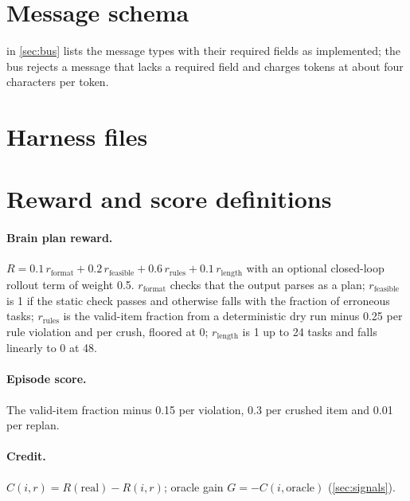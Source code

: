 \section{Message schema}\label{app:messages}
 in \cref{sec:bus} lists the \nMsgTypes{} message types with their required fields as implemented; the bus rejects a message that lacks a required field and charges tokens at about four characters per token.

\section{Harness files}\label{app:harness}
\begin{table}[h]
\centering\scriptsize

\caption{The \nHarnessFiles{} harness files with their retrieval keywords.}
\end{table}

\section{Reward and score definitions}\label{app:rewards}
\paragraph{Brain plan reward.} $R = 0.1\,r_{\text{format}} + 0.2\,r_{\text{feasible}} + 0.6\,r_{\text{rules}} + 0.1\,r_{\text{length}}$ with an optional closed-loop rollout term of weight 0.5.
$r_{\text{format}}$ checks that the output parses as a plan; $r_{\text{feasible}}$ is 1 if the static check passes and otherwise falls with the fraction of erroneous tasks; $r_{\text{rules}}$ is the valid-item fraction from a deterministic dry run minus 0.25 per rule violation and per crush, floored at 0; $r_{\text{length}}$ is 1 up to 24 tasks and falls linearly to 0 at 48.
\paragraph{Episode score.} The valid-item fraction minus 0.15 per violation, 0.3 per crushed item and 0.01 per replan.
\paragraph{Credit.} $C(i,r)=R(\text{real})-R(i,r)$; oracle gain $G=-C(i,\text{oracle})$ (\cref{sec:signals}).

